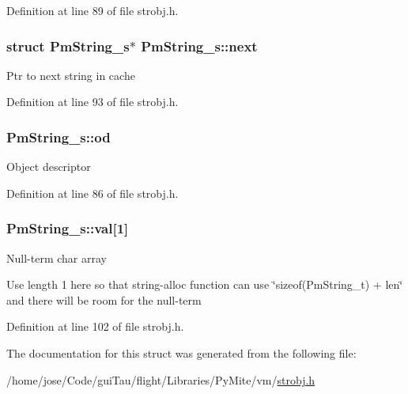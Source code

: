 Definition at line 89 of file strobj.\-h.

\hypertarget{struct_pm_string__s_a54ae7629000cca2b690c5d17fa4b030b}{
\subsubsection[{next}]{\setlength{\rightskip}{0pt plus 5cm}struct {\bf Pm\-String\-\_\-s}$\ast$ Pm\-String\-\_\-s\-::next}}\label{struct_pm_string__s_a54ae7629000cca2b690c5d17fa4b030b}
Ptr to next string in cache 

Definition at line 93 of file strobj.\-h.

\hypertarget{struct_pm_string__s_a61927674a4875d24e680f2a6201537a1}{
\subsubsection[{od}]{ Pm\-String\-\_\-s\-::od}}\label{struct_pm_string__s_a61927674a4875d24e680f2a6201537a1}
Object descriptor 

Definition at line 86 of file strobj.\-h.

\hypertarget{struct_pm_string__s_a668553e2db1c416ede8e9367bb123c2f}{
\subsubsection[{val}]{ Pm\-String\-\_\-s\-::val\mbox{[}1\mbox{]}}}\label{struct_pm_string__s_a668553e2db1c416ede8e9367bb123c2f}
Null-\/term char array

Use length 1 here so that string-\/alloc function can use \char`\"{}sizeof(\-Pm\-String\-\_\-t) + len\char`\"{} and there will be room for the null-\/term 

Definition at line 102 of file strobj.\-h.



The documentation for this struct was generated from the following file\-:\begin{DoxyCompactItemize}
\item 
/home/jose/\-Code/gui\-Tau/flight/\-Libraries/\-Py\-Mite/vm/\hyperlink{strobj_8h}{strobj.\-h}\end{DoxyCompactItemize}
